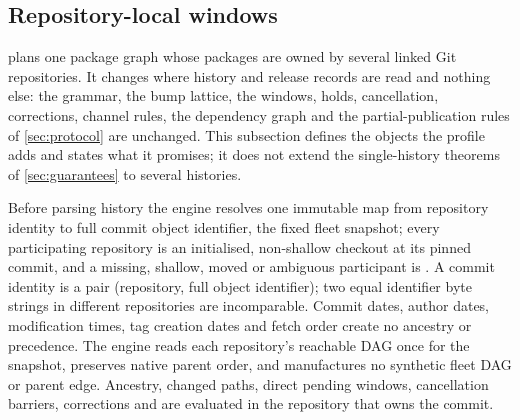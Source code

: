 \subsection{Repository-local windows}
\label{sec:exec-polyrepo}

 plans one package graph whose packages are owned by several linked
Git repositories. It changes where history and release records are read and
nothing else: the grammar, the bump lattice, the windows, holds,
cancellation, corrections, channel rules, the dependency graph and the
partial-publication rules of \cref{sec:protocol} are unchanged. This
subsection defines the objects the profile adds and states what it promises;
it does not extend the single-history theorems of \cref{sec:guarantees} to
several histories.

\begin{definition}
\label{def:exec-fleet}
Before parsing history the engine resolves one immutable map from repository
identity to full commit object identifier, the fixed fleet snapshot; every
participating repository is an initialised, non-shallow checkout at its
pinned commit, and a missing, shallow, moved or ambiguous participant is
. A commit identity is a pair (repository, full object
identifier); two equal identifier byte strings in different repositories are
incomparable. Commit dates, author dates, modification times, tag creation
dates and fetch order create no ancestry or precedence. The engine reads each
repository's reachable DAG once for the snapshot, preserves native parent
order, and manufactures no synthetic fleet DAG or parent edge. Ancestry,
changed paths, direct pending windows, cancellation barriers, corrections and
 are evaluated in the repository that owns the commit.
\end{definition}

